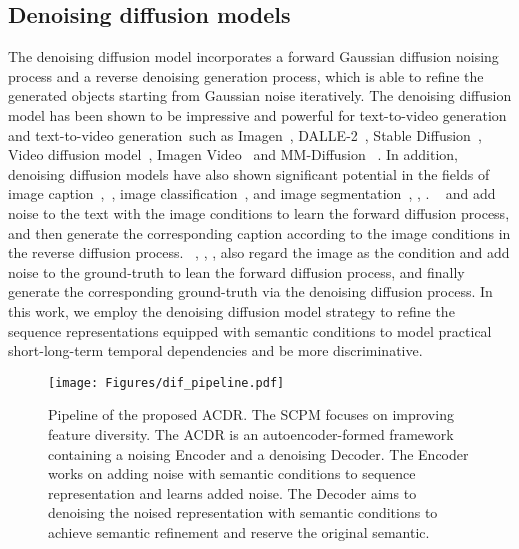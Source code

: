 \documentclass[sigconf]{acmart}
\begin{document}
\subsection{Denoising diffusion models}
\label{sec_realred_diffusion_model}
The denoising diffusion model incorporates a forward Gaussian diffusion noising process and a reverse denoising generation process, which is able to refine the generated objects starting from Gaussian noise iteratively.
The denoising diffusion model has been shown to be impressive and powerful for text-to-video generation and text-to-video generation~such as Imagen~\cite{2022imagen}, DALLE-2~\cite{Ramesh2022HierarchicalTI}, Stable Diffusion~\cite{2022StableDiffusion}, Video diffusion model~\cite{Ho2022VideoDM}, Imagen Video~\cite{Ho2022ImagenVH} and MM-Diffusion ~\cite{Ruan2022MMDiffusionLM}.
In addition, denoising diffusion models have also shown significant potential in the fields of image caption~\cite{Zhu2022DDcap},~\cite{He2022DiffusionBERTIG}, image classification~\cite{han2022card}, and image segmentation~\cite{Le2023MaskDiffMM}, \cite{Wu2023MedSegDiffV2DB}, \cite{Brempong2022DenoisingPF}. 
~\cite{Luo2022SemanticConditionalDN} and \cite{He2022DiffusionBERTIG} add noise to the text with the image conditions to learn the forward diffusion process, and then generate the corresponding caption according to the image conditions in the reverse diffusion process.
~\cite{han2022card}, \cite{Le2023MaskDiffMM}, \cite{Wu2023MedSegDiffV2DB}, \cite{Brempong2022DenoisingPF} also regard the image as the condition and add noise to the ground-truth to lean the forward diffusion process, and finally generate the corresponding ground-truth via the denoising diffusion process.
In this work, we employ the denoising diffusion model strategy to refine the sequence representations equipped with semantic conditions to model practical short-long-term temporal dependencies and be more discriminative. 



\begin{figure*}
  \centering
  \texttt{[image: Figures/dif\_pipeline.pdf]}
  \caption{Pipeline of the proposed ACDR.
  The SCPM focuses on improving feature diversity. The ACDR is an autoencoder-formed framework containing a noising Encoder and a denoising Decoder. The Encoder works on adding noise with semantic conditions to sequence representation and learns added noise. The Decoder aims to denoising the noised representation with semantic conditions to achieve semantic refinement and reserve the original semantic.}
  \label{Fig:pipline}
\end{figure*}
\end{document}
